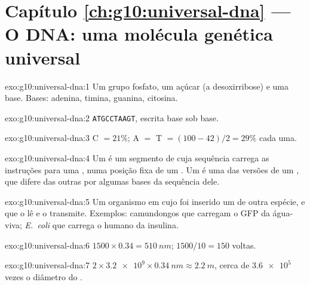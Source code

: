 \section*{Capítulo \ref{ch:g10:universal-dna} --- O DNA: uma molécula genética universal}

\begin{solution}{exo:g10:universal-dna:1}
Um grupo fosfato, um açúcar (a desoxirribose) e uma base. Bases:
adenina, timina, guanina, citosina.
\end{solution}

\begin{solution}{exo:g10:universal-dna:2}
\texttt{ATGCCTAAGT}, escrita base sob base.
\end{solution}

\begin{solution}{exo:g10:universal-dna:3}
C $= 21\%$; A $=$ T $= (100 - 42)/2 = 29\%$ cada uma.
\end{solution}

\begin{solution}{exo:g10:universal-dna:4}
Um  é um segmento de  cuja sequência carrega as instruções para
uma , numa posição fixa de um . Um  é uma das
versões de um , que difere das outras por algumas bases da
sequência dele.
\end{solution}

\begin{solution}{exo:g10:universal-dna:5}
Um organismo em cujo  foi inserido um  de outra espécie, e que o
lê e o transmite. Exemplos: camundongos que carregam o  GFP da
água-viva; \emph{E.~coli} que carrega o  humano da insulina.
\end{solution}

\begin{solution}{exo:g10:universal-dna:6}
$1500 \times 0.34 = \qty{510}{nm}$; $1500/10 = 150$ voltas.
\end{solution}

\begin{solution}{exo:g10:universal-dna:7}
$2 \times \num{3.2e9} \times \qty{0.34}{nm} \approx \qty{2.2}{m}$,
cerca de $\num{3.6e5}$ vezes o diâmetro do .
\end{solution}

